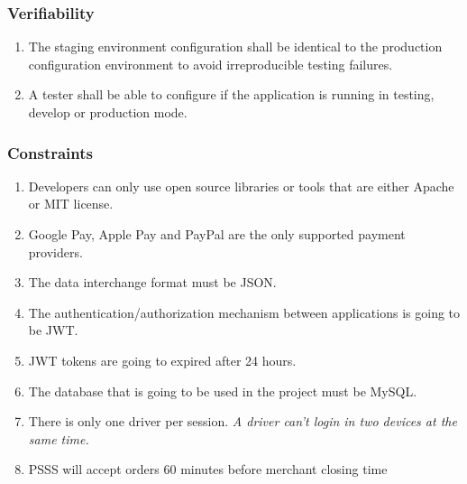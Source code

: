 \subsubsection{Verifiability}
\begin{enumerate}[label=VER-\arabic*]
    \item The staging environment configuration shall be identical to the 
    production configuration environment to avoid irreproducible 
    testing failures.
    \item A tester shall be able to configure if the application is 
    running in testing, develop or production mode.
\end{enumerate}
\subsubsection{Constraints}
\begin{enumerate}[label=CON-\arabic*]
    \item Developers can only use open source libraries or tools that are 
    either Apache or MIT license.
    \item Google Pay, Apple Pay and PayPal are the only supported payment providers.
    \item The data interchange format must be JSON.
    \item The authentication/authorization mechanism between applications 
    is going to be JWT.
    \item JWT tokens are going to expired after 24 hours.
    \item The database that is going to be used in the project must be MySQL.
    \item There is only one driver per session. \textit{A driver can't login 
    in two devices at the same time.}
    \item PSSS will accept orders 60 minutes before merchant closing time 
\end{enumerate}